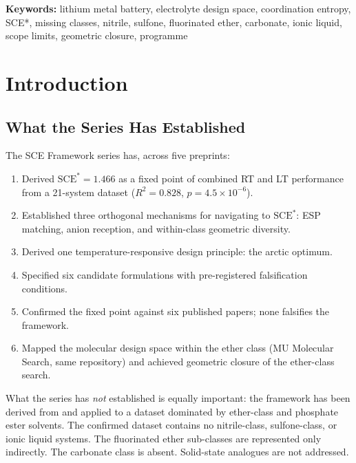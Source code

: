 \documentclass[11pt]{article}
\theoremstyle{plain}
\theoremstyle{definition}
\theoremstyle{remark}
\begin{document}
\vspace{1em}
\noindent\textbf{Keywords:} lithium metal battery, electrolyte
design space, coordination entropy, SCE*, missing classes, nitrile,
sulfone, fluorinated ether, carbonate, ionic liquid, scope limits,
geometric closure, programme

\tableofcontents
\newpage

\section{Introduction}

\subsection{What the Series Has Established}

The SCE Framework series has, across five preprints:

\begin{enumerate}[leftmargin=2em]
  \item Derived $\mathrm{SCE}^{*} = 1.466$ as a fixed point of
        combined RT and LT performance from a 21-system dataset
        ($R^2 = 0.828$, $p = 4.5 \times 10^{-6}$).
  \item Established three orthogonal mechanisms for navigating
        to $\mathrm{SCE}^{*}$: ESP matching, anion reception, and
        within-class geometric diversity.
  \item Derived one temperature-responsive design principle: the
        arctic optimum.
  \item Specified six candidate formulations with pre-registered
        falsification conditions.
  \item Confirmed the fixed point against six published papers;
        none falsifies the framework.
  \item Mapped the molecular design space within the ether class
        (MU Molecular Search, same repository) and achieved
        geometric closure of the ether-class search.
\end{enumerate}

What the series has \emph{not} established is equally important:
the framework has been derived from and applied to a dataset
dominated by ether-class and phosphate ester solvents.  The
confirmed dataset contains no nitrile-class, sulfone-class,
or ionic liquid systems.  The fluorinated ether sub-classes
are represented only indirectly.  The carbonate class is absent.
Solid-state analogues are not addressed.
\end{document}
